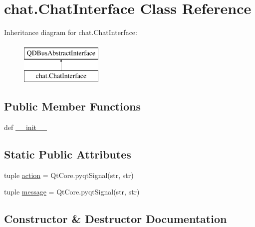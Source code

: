 \hypertarget{classchat_1_1ChatInterface}{}\section{chat.\+Chat\+Interface Class Reference}
\label{classchat_1_1ChatInterface}
Inheritance diagram for chat.\+Chat\+Interface\+:\begin{figure}[H]
\begin{center}
\leavevmode
\includegraphics[height=2.000000cm]{classchat_1_1ChatInterface}
\end{center}
\end{figure}
\subsection*{Public Member Functions}
\begin{DoxyCompactItemize}
\item 
def \hyperlink{classchat_1_1ChatInterface_aff306ca5612d84e518059a0c80b22590}{\+\_\+\+\_\+init\+\_\+\+\_\+}
\end{DoxyCompactItemize}
\subsection*{Static Public Attributes}
\begin{DoxyCompactItemize}
\item 
tuple \hyperlink{classchat_1_1ChatInterface_a021054cd17f91a35d85fd0d148c0b00b}{action} = Qt\+Core.\+pyqt\+Signal(str, str)
\item 
tuple \hyperlink{classchat_1_1ChatInterface_a8c359a2f9202fd45f7ef810fc454fed7}{message} = Qt\+Core.\+pyqt\+Signal(str, str)
\end{DoxyCompactItemize}


\subsection{Constructor \& Destructor Documentation}
\hypertarget{classchat_1_1ChatInterface_aff306ca5612d84e518059a0c80b22590}{}
